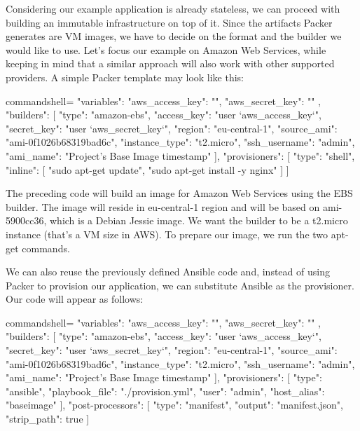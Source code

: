 
Considering our example application is already stateless, we can proceed with building an immutable infrastructure on top of it. Since the artifacts Packer generates are VM images, we have to decide on the format and the builder we would like to use. Let's focus our example on Amazon Web Services, while keeping in mind that a similar approach will also work with other supported providers. A simple Packer template may look like this:

\begin{tcblisting}{commandshell={}}
{
  "variables": {
    "aws_access_key": "",
    "aws_secret_key": ""
  },
  "builders": [{
    "type": "amazon-ebs",
    "access_key": "{{user `aws_access_key`}}",
    "secret_key": "{{user `aws_secret_key`}}",
    "region": "eu-central-1",
    "source_ami": "ami-0f1026b68319bad6c",
    "instance_type": "t2.micro",
    "ssh_username": "admin",
    "ami_name": "Project's Base Image {{timestamp}}"
  }],
  "provisioners": [{
    "type": "shell",
    "inline": [
      "sudo apt-get update",
      "sudo apt-get install -y nginx"
    ]
  }]
}
\end{tcblisting}

The preceding code will build an image for Amazon Web Services using the EBS builder. The image will reside in eu-central-1 region and will be based on ami-5900cc36, which is a Debian Jessie image. We want the builder to be a t2.micro instance (that's a VM size in AWS). To prepare our image, we run the two apt-get commands.

We can also reuse the previously defined Ansible code and, instead of using Packer to provision our application, we can substitute Ansible as the provisioner. Our code will appear as follows:

\begin{tcblisting}{commandshell={}}
{
  "variables": {
    "aws_access_key": "",
    "aws_secret_key": ""
  },
  "builders": [{
    "type": "amazon-ebs",
    "access_key": "{{user `aws_access_key`}}",
    "secret_key": "{{user `aws_secret_key`}}",
    "region": "eu-central-1",
    "source_ami": "ami-0f1026b68319bad6c",
    "instance_type": "t2.micro",
    "ssh_username": "admin",
    "ami_name": "Project's Base Image {{timestamp}}"
  }],
  "provisioners": [{
    "type": "ansible",
    "playbook_file": "./provision.yml",
    "user": "admin",
    "host_alias": "baseimage"
  }],
  "post-processors": [{
    "type": "manifest",
    "output": "manifest.json",
    "strip_path": true
  }]
}
\end{tcblisting}

